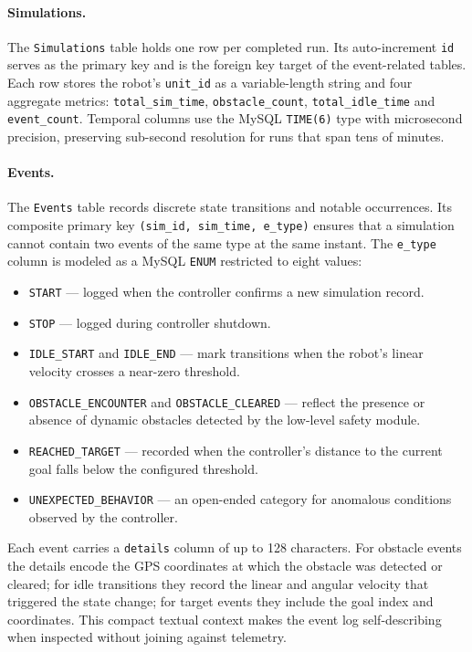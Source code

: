 \paragraph{Simulations.}
The \texttt{Simulations} table holds one row per completed run. Its auto-increment \texttt{id} serves as the primary key and is the foreign key target of the event-related tables. Each row stores the robot's \texttt{unit\_id} as a variable-length string and four aggregate metrics: \texttt{total\_sim\_time}, \texttt{obstacle\_count}, \texttt{total\_idle\_time} and \texttt{event\_count}. Temporal columns use the MySQL \texttt{TIME(6)} type with microsecond precision, preserving sub-second resolution for runs that span tens of minutes.

\paragraph{Events.}
The \texttt{Events} table records discrete state transitions and notable occurrences. Its composite primary key \texttt{(sim\_id, sim\_time, e\_type)} ensures that a simulation cannot contain two events of the same type at the same instant. The \texttt{e\_type} column is modeled as a MySQL \texttt{ENUM} restricted to eight values:

\begin{itemize}[itemsep=0.2ex, topsep=0.4ex]
  \item \texttt{START} --- logged when the controller confirms a new simulation record.
  \item \texttt{STOP} --- logged during controller shutdown.
  \item \texttt{IDLE\_START} and \texttt{IDLE\_END} --- mark transitions when the robot's linear velocity crosses a near-zero threshold.
  \item \texttt{OBSTACLE\_ENCOUNTER} and \texttt{OBSTACLE\_CLEARED} --- reflect the presence or absence of dynamic obstacles detected by the low-level safety module.
  \item \texttt{REACHED\_TARGET} --- recorded when the controller's distance to the current goal falls below the configured threshold.
  \item \texttt{UNEXPECTED\_BEHAVIOR} --- an open-ended category for anomalous conditions observed by the controller.
\end{itemize}

Each event carries a \texttt{details} column of up to 128 characters. For obstacle events the details encode the GPS coordinates at which the obstacle was detected or cleared; for idle transitions they record the linear and angular velocity that triggered the state change; for target events they include the goal index and coordinates. This compact textual context makes the event log self-describing when inspected without joining against telemetry.

